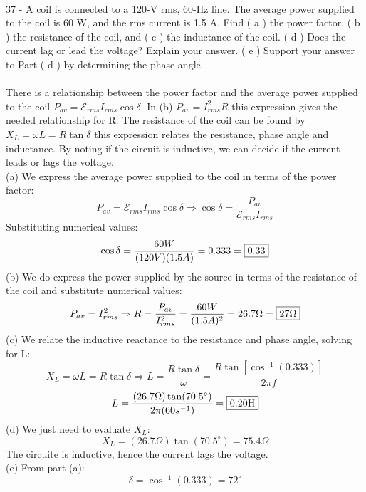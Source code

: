\documentclass{report}
\begin{document}
\paragraph{}
37 - A coil is connected to a 120-V rms, 60-Hz line. The average power supplied to the coil is 60 W, and the rms current is 1.5 A. Find ( a ) the power factor, ( b ) the resistance of the coil, and ( c ) the inductance of the coil. ( d ) Does the current lag or lead the voltage? Explain your answer. ( e ) Support your answer to Part ( d ) by determining the phase angle.\\
\\
There is a relationship between the power factor and the average power supplied to the coil $P_{av} = \mathcal{E}_{rms}I_{rms}\cos \delta$. In (b) $P_{av} = I_{rms}^2R$ this expression gives the needed relationship for R. The resistance of the coil can be found by $X_L = \omega L = R \tan \delta$ this expression relates the resistance, phase angle and inductance. By noting if the circuit is inductive, we can decide if the current leads or lags the voltage.\\
(a) We express the average power supplied to the coil in terms of the power factor:
$$P_{av} = \mathcal{E}_{rms}I_{rms} \cos \delta \Rightarrow \cos \delta = \frac{P_{av}}{\mathcal{E}_{rms}I_{rms}}$$
Substituting numerical values:
$$\cos \delta = \frac{60W}{(120V)(1.5A)} = 0.333 = \fbox{0.33}$$
(b) We do express the power supplied by the source in terms of the resistance of the coil and substitute numerical values:
$$P_{av} = I_{rms}^2 \Rightarrow R = \frac{P_{av}}{I_{rms}^2} = \frac{60W}{(1.5A)^2} = 26.7\Omega = \fbox{$27\Omega $}$$
(c) We relate the inductive reactance to the resistance and phase angle, solving for L:
$$X_L = \omega L = R \tan \delta \Rightarrow L = \frac{R \tan \delta}{\omega} = \frac{R \tan[\cos^{-1}(0.333)]}{2\pi f}$$
$$L = \frac{(26.7\Omega)\tan (70.5^{\circ})}{2\pi (60s^{-1})} = \fbox{0.20H}$$
(d) We just need to evaluate $X_L$:
$$X_L = (26.7\Omega)\tan (70.5^{\circ}) = 75.4\Omega$$
The circuite is inductive, hence the current lags the voltage.\\
(e) From part (a):
$$\delta = \cos^{-1}(0.333) = 72^{\circ}$$
\end{document}
